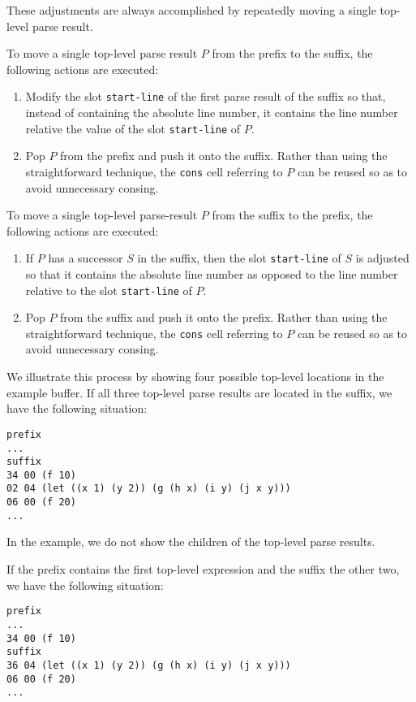 These adjustments are always accomplished by repeatedly moving a
single top-level parse result.

To move a single top-level parse result $P$ from the prefix to the
suffix, the following actions are executed:

\begin{enumerate}
\item Modify the slot \texttt{start-line} of the first parse result of
  the suffix so that, instead of containing the absolute line number,
  it contains the line number relative the value of the slot
  \texttt{start-line} of $P$.
\item Pop $P$ from the prefix and push it onto the suffix.  Rather
  than using the straightforward technique, the \texttt{cons} cell
  referring to $P$ can be reused so as to avoid unnecessary consing.
\end{enumerate}

To move a single top-level parse-result $P$ from the suffix to the
prefix, the following actions are executed:

\begin{enumerate}
\item If $P$ has a successor $S$ in the suffix, then the slot
  \texttt{start-line} of $S$ is adjusted so that it contains the
  absolute line number as opposed to the line number relative to the
  slot \texttt{start-line} of $P$.
\item Pop $P$ from the suffix and push it onto the prefix.  Rather
  than using the straightforward technique, the \texttt{cons} cell
  referring to $P$ can be reused so as to avoid unnecessary consing.
\end{enumerate}

We illustrate this process by showing four possible top-level
locations in the example buffer.  If all three top-level parse results
are located in the suffix, we have the following situation:

\begin{verbatim}
prefix
...
suffix
34 00 (f 10)
02 04 (let ((x 1) (y 2)) (g (h x) (i y) (j x y)))
06 00 (f 20)
...
\end{verbatim}

In the example, we do not show the children of the top-level parse
results.

If the prefix contains the first top-level expression and the suffix
the other two, we have the following situation:

\begin{verbatim}
prefix
...
34 00 (f 10)
suffix
36 04 (let ((x 1) (y 2)) (g (h x) (i y) (j x y)))
06 00 (f 20)
...
\end{verbatim}

